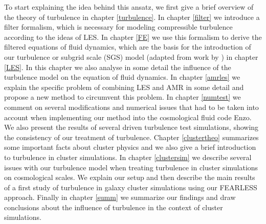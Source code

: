 To start explaining the idea behind this ansatz, we first give a brief overview
of the theory of turbulence in chapter \ref{turbulence}. In chapter \ref{filter}
we introduce a filter formalism, which is necessary for modeling compressible
turbulence according to the ideas of LES. In chapter \ref{FE} we use this
formalism to derive the filtered equations of fluid dynamics, which are the
basis for the introduction of our turbulence or subgrid scale (SGS) model
(adapted from work by \citet{Schmidt2006}) in chapter \ref{LES}.
In this chapter we also analyse in some detail the
influence of the turbulence model on the equation of fluid dynamics. In chapter
\ref{amrles} we explain the specific problem of combining LES and AMR in
some detail and propose a new method to circumvent this problem. In chapter
\ref{numtest} we comment on several modifications and numerical issues that
had to be taken into account when implementing our method into the cosmological
fluid code Enzo. We also present the results of several driven turbulence test
simulations, showing the consistency of our treatment of turbulence. Chapter
\ref{clustertheo} summarizes some important facts about cluster physics and we
also give a brief introduction to turbulence in cluster simulations.
In chapter \ref{clustersim} we describe several issues with our turbulence model
when treating turbulence in cluster simulations on cosmological scales. We
explain our setup and then describe the main results of a first study of
turbulence in galaxy cluster simulations using our FEARLESS approach. Finally in
chapter \ref{summ} we
summarize our findings and draw conclusions about the influence of turbulence
in the context of cluster simulations. 

